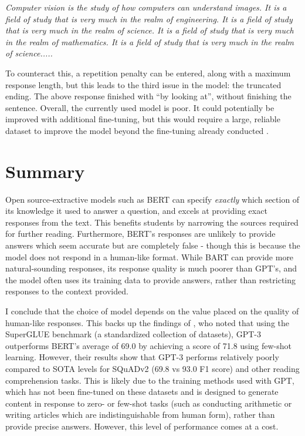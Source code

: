 \documentclass{article}
\newenvironment{itquote}
  {\begin{displayquote}\itshape}
  {\end{displayquote}\ignorespacesafterend}
\begin{document}
\begin{itquote}
    Computer vision is the study of how computers can understand images. It is a field of study that is very much in the realm of engineering. It is a field of study that is very much in the realm of science. It is a field of study that is very much in the realm of mathematics. It is a field of study that is very much in the realm of science.....
\end{itquote}

To counteract this, a repetition penalty can be entered, along with a maximum response length, but this leads to the third issue in the model: the truncated ending. The above response finished with ``by looking at'', without finishing the sentence. Overall, the currently used model is poor. It could potentially be improved with additional fine-tuning, but this would require a large, reliable dataset to improve the model beyond the fine-tuning already conducted \citep{Blagojevic}.

\section{Summary}\label{sec:interim_summary}

Open source-extractive models such as BERT can specify \textit{exactly} which section of its knowledge it used to answer a question, and excels at providing exact responses from the text. This benefits students by narrowing the sources required for further reading. Furthermore, BERT's responses are unlikely to provide answers which seem accurate but are completely false - though this is because the model does not respond in a human-like format. While BART can provide more natural-sounding responses, its response quality is much poorer than GPT's, and the model often uses its training data to provide answers, rather than restricting responses to the context provided.

I conclude that the choice of model depends on the value placed on the quality of human-like responses. This backs up the findings of \citet{brown2020}, who noted that using the SuperGLUE benchmark (a standardized collection of datasets), GPT-3 outperforms BERT's average of 69.0 by achieving a score of 71.8 using few-shot learning. However, their results show that GPT-3 performs relatively poorly compared to SOTA levels for SQuADv2 (69.8 vs 93.0 F1 score) and other reading comprehension tasks. This is likely due to the training methods used with GPT, which has not been fine-tuned on these datasets and is designed to generate content in response to zero- or few-shot tasks (such as conducting arithmetic or writing articles which are indistinguishable from human form), rather than provide precise answers. However, this level of performance comes at a cost.
\end{document}
